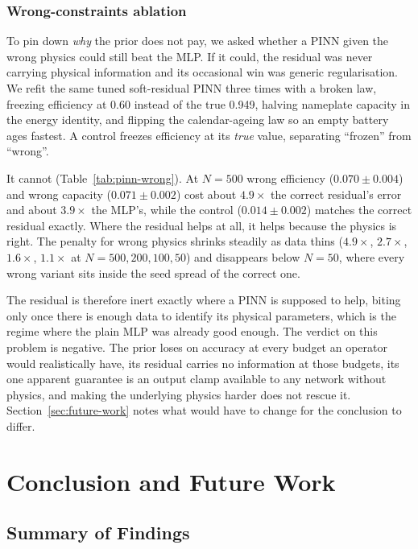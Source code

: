 \documentclass[conference]{IEEEtran}
\begin{document}
\subsubsection{Wrong-constraints ablation}
\label{sec:results-pinn-wrong}

To pin down \emph{why} the prior does not pay, we asked whether a PINN given the wrong physics could still beat the MLP. If it could, the residual was never carrying physical information and its occasional win was generic regularisation. We refit the same tuned soft-residual PINN three times with a broken law, freezing efficiency at 0.60 instead of the true 0.949, halving nameplate capacity in the energy identity, and flipping the calendar-ageing law so an empty battery ages fastest. A control freezes efficiency at its \emph{true} value, separating ``frozen'' from ``wrong''.

It cannot (Table~\ref{tab:pinn-wrong}). At $N{=}500$ wrong efficiency ($0.070\pm0.004$) and wrong capacity ($0.071\pm0.002$) cost about $4.9\times$ the correct residual's error and about $3.9\times$ the MLP's, while the control ($0.014\pm0.002$) matches the correct residual exactly. Where the residual helps at all, it helps because the physics is right. The penalty for wrong physics shrinks steadily as data thins ($4.9\times$, $2.7\times$, $1.6\times$, $1.1\times$ at $N = 500, 200, 100, 50$) and disappears below $N{=}50$, where every wrong variant sits inside the seed spread of the correct one.

The residual is therefore inert exactly where a PINN is supposed to help, biting only once there is enough data to identify its physical parameters, which is the regime where the plain MLP was already good enough. The verdict on this problem is negative. The prior loses on accuracy at every budget an operator would realistically have, its residual carries no information at those budgets, its one apparent guarantee is an output clamp available to any network without physics, and making the underlying physics harder does not rescue it. Section~\ref{sec:future-work} notes what would have to change for the conclusion to differ.

\section{Conclusion and Future Work}
\label{sec:conclusion}

\subsection{Summary of Findings}
\end{document}
